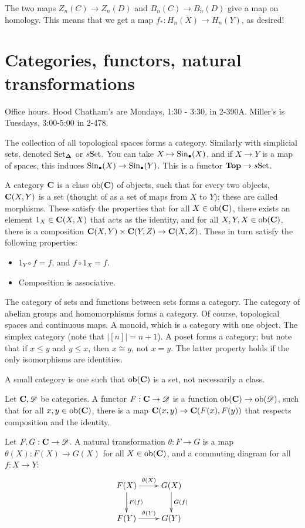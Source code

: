 The two maps $Z_n(C)\to Z_n(D)$ and $B_n(C)\to B_n(D)$ give a map on homology. This means that we get a map $f_\ast: H_n(X)\to H_n(Y)$, as desired!
\section{Categories, functors, natural transformations}
Office hours. Hood Chatham's are Mondays, 1:30 - 3:30, in 2-390A. Miller's is Tuesdays, 3:00-5:00 in 2-478.

The collection of all topological spaces forms a category. Similarly with simplicial sets, denoted ${\mathrm{Set}}_{\mathbf \Delta}$ or $s{\mathrm{Set}}$. You can take $X\mapsto \mathrm{Sin}_\bullet(X)$, and if $X\to Y$ is a map of spaces, this induces $\mathrm{Sin}_\bullet(X)\to\mathrm{Sin}_\bullet(Y)$. This is a functor $\mathbf{Top}\to s{\mathrm{Set}}$.
\begin{definition}
A category $\mathbf C$ is a class $\mathrm{ob}(\mathbf C)$ of objects, such that for every two objects, $\mathbf C(X,Y)$ is a set (thought of as a set of maps from $X$ to $Y$); these are called morphisms. These satisfy the properties that for all $X\in\mathrm{ob}(\mathbf C)$, there exists an element $1_X\in\mathbf C(X,X)$ that acts as the identity, and for all $X,Y,X\in\mathrm{ob}(\mathbf C)$, there is a composition $\mathbf C(X,Y)\times\mathbf C(Y,Z)\to\mathbf C(X,Z)$. These in turn satisfy the following properties:
\begin{itemize}
\item $1_Y\circ f=f$, and $f\circ 1_X=f$.
\item Composition is associative.
\end{itemize}
\end{definition}
\begin{example}
The category of sets and functions between sets forms a category. The category of abelian groups and homomorphisms forms a category. Of course, topological spaces and continuous maps. A monoid, which is a category with one object. The simplex category (note that $|[n]|=n+1$). A poset forms a category; but note that if $x\leq y$ and $y\leq x$, then $x\cong y$, not $x=y$. The latter property holds if the only isomorphisms are identities.
\end{example}
A small category is one such that $\mathrm{ob}(\mathbf C)$ is a set, not necessarily a class.
\begin{definition}
Let $\mathbf C,\mathscr D$ be categories. A functor $F:\mathbf C\to\mathscr D$ is a function $\mathrm{ob}(\mathbf C)\to\mathrm{ob}(\mathscr D)$, such that for all $x,y\in\mathrm{ob}(\mathbf C)$, there is a map $\mathbf C(x,y)\to\mathbf C(F(x),F(y))$ that respects composition and the identity.

Let $F,G:\mathbf C\to\mathscr D$. A natural transformation $\theta:F\to G$ is a map $\theta(X):F(X)\to G(X)$ for all $X\in\mathrm{ob}(\mathbf C)$, and a commuting diagram for all $f:X\to Y$:
\begin{equation*}
\xymatrix{F(X)\ar[d]^{F(f)}\ar[r]^{\theta(X)} & G(X)\ar[d]^{G(f)}\\
F(Y)\ar[r]^{\theta(Y)} & G(Y)}
\end{equation*}
\end{definition}
